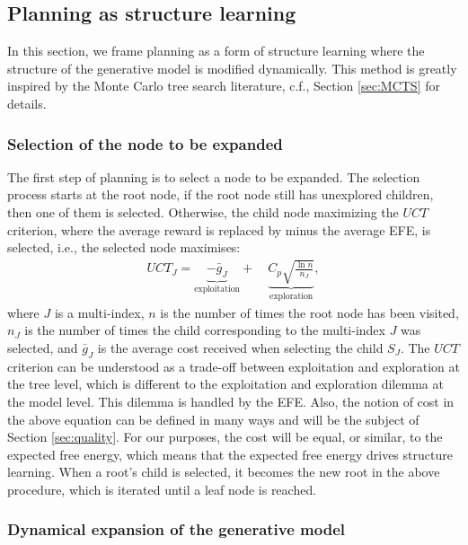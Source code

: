 \documentclass[twoside,11pt]{article}
\begin{document}
\subsection{Planning as structure learning}

In this section, we frame planning as a form of structure learning where the structure of the generative model is modified dynamically. This method is greatly inspired by the Monte Carlo tree search literature, c.f., Section \ref{sec:MCTS} for details.

\subsubsection{Selection of the node to be expanded} \label{sec:selection}

The first step of planning is to select a node to be expanded. The selection process starts at the root node, if the root node still has unexplored children, then one of them is selected. Otherwise, the child node maximizing the $UCT$ criterion, where the average reward is replaced by minus the average EFE, is selected, i.e., the selected node maximises:
\begin{align}
UCT_J = \underbrace{- \bar{g}_J}_{\text{exploitation}} +\quad \underbrace{C_p \sqrt{\frac{\ln n}{n_J}}}_{\text{exploration}},
\end{align}
where $J$ is a multi-index, $n$ is the number of times the root node has been visited, $n_J$ is the number of times the child corresponding to the multi-index $J$ was selected, and $\bar{g}_J$ is the average cost received when selecting the child $S_J$. The $UCT$ criterion can be understood as a trade-off between exploitation and exploration at the tree level, which is different to the exploitation and exploration dilemma at the model level. This dilemma is handled by the EFE. Also, the notion of cost in the above equation can be defined in many ways and will be the subject of Section \ref{sec:quality}. For our purposes, the cost will be equal, or similar, to the expected free energy, which means that the expected free energy drives structure learning. When a root's child is selected, it becomes the new root in the above procedure, which is iterated until a leaf node is reached. 

\subsubsection{Dynamical expansion of the generative model} \label{sec:expansion}
\end{document}
